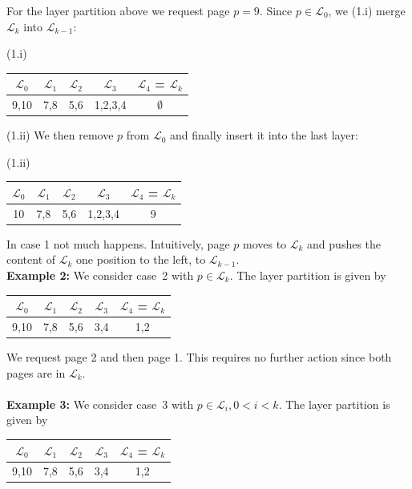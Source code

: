 \documentclass[a4paper,12pt, titlepage]{article}  %
\newcommand{\cl}{\mathcal{L}}   %
\begin{document}
For the layer partition above we request page $p=9$. Since $p \in \cl_0$, we (1.i) merge $\cl_k$ into
$\cl_{k-1}$:

\begin{center}
	(1.i)
	\begin{tabular}[ht]{|c|c|c|c|c|}
	  \hline
		$\cl_0$ & $\cl_1$ & $\cl_2$ & $\cl_3$ & $\cl_4$ = $\cl_k$ \\
		\hline		
		9,10 & 7,8 & 5,6 & 1,2,3,4 & $\emptyset$ \\
		\hline
	\end{tabular}
\end{center}

(1.ii) We then remove $p$ from $\cl_0$ and finally insert it into the last layer:

\begin{center}
	(1.ii)
	\begin{tabular}[ht]{|c|c|c|c|c|}
	  \hline
		$\cl_0$ & $\cl_1$ & $\cl_2$ & $\cl_3$ & $\cl_4$ = $\cl_k$ \\
		\hline		
		10 & 7,8 & 5,6 & 1,2,3,4 & 9 \\
		\hline

	\end{tabular}
\end{center}

\noindent In case 1 not much happens. Intuitively, page $p$ moves to $\cl_{k}$ and pushes the content of $\cl_k$ one position to the left, to $\cl_{k-1}$.\\

\noindent \textbf{Example 2:}
We consider case~2 with $p \in \cl_k$. The layer partition is given by
\begin{center}
	\begin{tabular}[ht]{|c|c|c|c|c|}
	  \hline
		$\cl_0$ & $\cl_1$ & $\cl_2$ & $\cl_3$ & $\cl_4$ = $\cl_k$ \\
		\hline		
		9,10 & 7,8 & 5,6 & 3,4 & 1,2 \\
		\hline
	\end{tabular}
\end{center}
We request page 2 and then page 1. This requires no further action since both pages are in $\cl_k$.\\
\\
\noindent \textbf{Example 3:} We consider case~3 with $p \in \cl_i, 0<i<k$. The layer
partition is given by
\begin{center}
	\begin{tabular}[ht]{|c|c|c|c|c|}
	  \hline
		$\cl_0$ & $\cl_1$ & $\cl_2$ & $\cl_3$ & $\cl_4$ = $\cl_k$ \\
		\hline		
		9,10 & 7,8 & 5,6 & 3,4 & 1,2 \\
		\hline
	\end{tabular}
\end{center}
\end{document}
